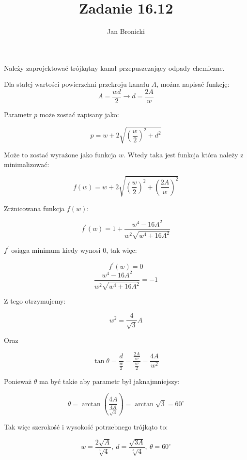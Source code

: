 \documentclass{article}
\title{Zadanie 16.12}
\author{Jan Bronicki}
\date{}
\begin{document}
\maketitle

Należy zaprojektować trójkątny kanał przepuszczający odpady chemiczne.

Dla stałej wartości powierzchni przekroju kanału $A$, można napisać funkcję:
$$
    A=\frac{wd}{2} \rightarrow d=\frac{2A}{w}
$$

Parametr $p$ może zostać zapisany jako:

$$
    p=w+2\sqrt{\left(\frac{w}{2}\right)^{2}+d^{2}}
$$

Może to zostać wyrażone jako funkcja $w$. Wtedy taka jest funkcja która należy z minimalizować:

$$
    f(w) = w+2\sqrt{\left(\frac{w}{2}\right)^{2}+\left(\frac{2A}{w}\right)^{2}}
$$

Zrżnicowana funkcja $f(w)$:

$$
    f^{\prime}(w)=1+\frac{w^{4}-16A^{2}}{w^{2}\sqrt{w^{4}+16A^{2}}}
$$


$f^{\prime}$ osiąga minimum kiedy wynosi $0$, tak więc:


$$
    f^{\prime}(w)=0
$$
$$
    \frac{w^{4}-16A^{2}}{w^{2}\sqrt{w^{4}+16A^{2}}}=-1
$$

Z tego otrzymujemy:

$$
    w^{2}=\frac{4}{\sqrt{3}}A
$$

Oraz

$$
    \tan \theta = \frac{d}{\frac{w}{2}}=\frac{\frac{2A}{w}}{\frac{w}{2}}=\frac{4A}{w^{2}}
$$

\newpage

Ponieważ $\theta$ ma być takie aby parametr był jaknajmniejszy:

$$
    \theta = \arctan \left(\frac{4A}{\frac{4A}{\sqrt{3}}}\right)=\arctan \sqrt{3}=60^{\circ}
$$

Tak więc szerokość i wysokość potrzebnego trójkąto to:

$$
    w=\frac{2\sqrt{A}}{\sqrt[3]{4}}, \ d=\frac{\sqrt{3A}}{\sqrt[3]{4}}, \ \theta=60^{\circ}
$$
\end{document}
